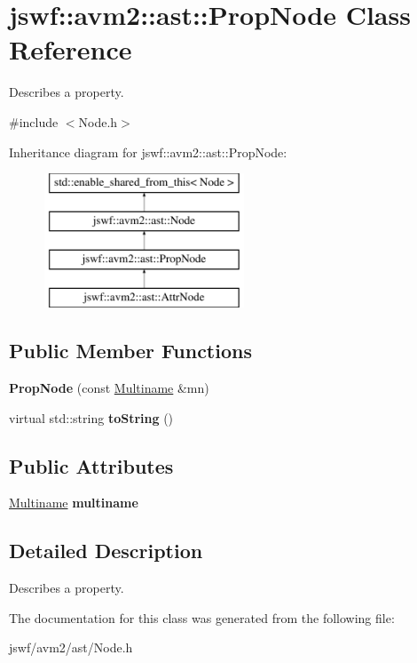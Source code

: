 \hypertarget{classjswf_1_1avm2_1_1ast_1_1_prop_node}{\section{jswf\+:\+:avm2\+:\+:ast\+:\+:Prop\+Node Class Reference}
\label{classjswf_1_1avm2_1_1ast_1_1_prop_node}
}


Describes a property.  




{\ttfamily \#include $<$Node.\+h$>$}

Inheritance diagram for jswf\+:\+:avm2\+:\+:ast\+:\+:Prop\+Node\+:\begin{figure}[H]
\begin{center}
\leavevmode
\includegraphics[height=4.000000cm]{classjswf_1_1avm2_1_1ast_1_1_prop_node}
\end{center}
\end{figure}
\subsection*{Public Member Functions}
\begin{DoxyCompactItemize}
\item 
\hypertarget{classjswf_1_1avm2_1_1ast_1_1_prop_node_a0efd76aea3fbd30cc7b2fb15816a9a79}{{\bfseries Prop\+Node} (const \hyperlink{structjswf_1_1avm2_1_1_multiname}{Multiname} \&mn)}\label{classjswf_1_1avm2_1_1ast_1_1_prop_node_a0efd76aea3fbd30cc7b2fb15816a9a79}

\item 
\hypertarget{classjswf_1_1avm2_1_1ast_1_1_prop_node_a2c33afc7514458217957a35a2d6035ea}{virtual std\+::string {\bfseries to\+String} ()}\label{classjswf_1_1avm2_1_1ast_1_1_prop_node_a2c33afc7514458217957a35a2d6035ea}

\end{DoxyCompactItemize}
\subsection*{Public Attributes}
\begin{DoxyCompactItemize}
\item 
\hypertarget{classjswf_1_1avm2_1_1ast_1_1_prop_node_aa1c1a8ee3ae31c69ff0f397f22822289}{\hyperlink{structjswf_1_1avm2_1_1_multiname}{Multiname} {\bfseries multiname}}\label{classjswf_1_1avm2_1_1ast_1_1_prop_node_aa1c1a8ee3ae31c69ff0f397f22822289}

\end{DoxyCompactItemize}


\subsection{Detailed Description}
Describes a property. 

The documentation for this class was generated from the following file\+:\begin{DoxyCompactItemize}
\item 
jswf/avm2/ast/Node.\+h\end{DoxyCompactItemize}
